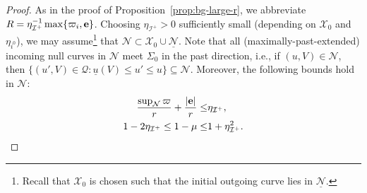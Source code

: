 \documentclass[10pt, reqno]{amsart}
\theoremstyle{definition}
\theoremstyle{remark}
\theoremstyle{conjecture}
\numberwithin{equation}{section}
\newcommand{\abs}[1]{\vert#1\vert}
\newcommand{\set}[1]{\{#1\}}
\newcommand{\0}{\emptyset}
\newcommand{\Sgm}{\Sigma}
\newcommand{\bfe}{{\bf e}}
\newcommand{\calI}{\mathcal I}
\newcommand{\calN}{\mathcal N}
\newcommand{\calQ}{\mathcal Q}
\newcommand{\calX}{\mathcal X}
\newcommand{\PD}{\calQ}
\newcommand{\e}{\bfe}							%
\newcommand{\NI}{\calI^{+}}						%
\begin{document}
\begin{proof}
As in the proof of Proposition~\ref{prop:bg-large-r}, we abbreviate $R = \eta_{\NI}^{-1} \max \set{\varpi_{i}, \e}$. Choosing $\eta_{\NI} > 0$ sufficiently small (depending on $\calX_{0}$ and $\eta_{i^{0}}$), we may assume\footnote{Recall that $\calX_{0}$ is chosen such that the initial outgoing curve lies in $\underline{\calN}$.} that $\calN \subset \calX_{0} \cup \underline{\calN}$. Note that all (maximally-past-extended) incoming null curves in $\calN$ meet $\Sgm_{0}$ in the past direction, i.e., if $(u, V) \in \calN$, then $\set{(u', V) \in \PD : \underline{u}(V) \leq u' \leq u} \subseteq \calN$. Moreover, the following bounds hold in $\calN$:
\begin{align} 
	\frac{\sup_{\calN} \varpi}{r} + \frac{\abs{\e}}{r} \leq & \eta_{\NI}, \label{eq:DR-large-r:pf-me} \\
	1 - 2 \eta_{\NI} \leq 1 - \mu \leq & 1 + \eta_{\NI}^{2} . \label{eq:DR-large-r:pf-mu}
\end{align}


\end{proof}
\end{document}
